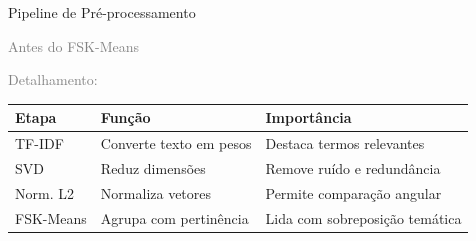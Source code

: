 \documentclass[aspectratio=43]{beamer}
\begin{document}
\begin{frame}[t]{Pipeline de Pré-processamento}

\textcolor{gray}{\large Antes do FSK-Means}

\vspace{0.01cm}

\begin{center}
\end{center}

\vspace{0.5cm}

\textcolor{gray}{\large Detalhamento:}

\vspace{0.3cm}

\scriptsize
\renewcommand{\arraystretch}{1.25}
\begin{center}
\begin{tabular}{P{2.0cm} P{3.6cm} P{3.6cm}}
\toprule
\textbf{Etapa} & \textbf{Função} & \textbf{Importância} \\
\midrule
TF-IDF & Converte texto em pesos & Destaca termos relevantes \\
SVD & Reduz dimensões & Remove ruído e redundância \\
Norm. L2 & Normaliza vetores & Permite comparação angular \\
FSK-Means & Agrupa com pertinência & Lida com sobreposição temática \\
\bottomrule
\end{tabular}
\end{center}

\end{frame}
\end{document}
